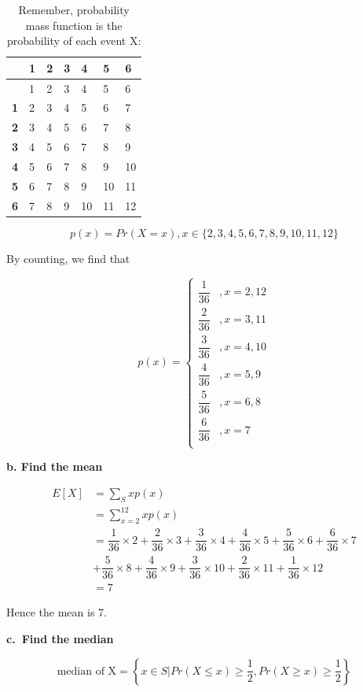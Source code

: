 \documentclass[
]{article}
\begin{document}
\begin{longtable}[]{@{}lllllll@{}}
\caption{Remember, probability mass function is the probability of each
event X:}\tabularnewline
\toprule
& 1 & 2 & 3 & 4 & 5 & 6 \\
\midrule
\endfirsthead
\toprule
& 1 & 2 & 3 & 4 & 5 & 6 \\
\midrule
\endhead
\textbf{1} & 2 & 3 & 4 & 5 & 6 & 7 \\
\textbf{2} & 3 & 4 & 5 & 6 & 7 & 8 \\
\textbf{3} & 4 & 5 & 6 & 7 & 8 & 9 \\
\textbf{4} & 5 & 6 & 7 & 8 & 9 & 10 \\
\textbf{5} & 6 & 7 & 8 & 9 & 10 & 11 \\
\textbf{6} & 7 & 8 & 9 & 10 & 11 & 12 \\
\bottomrule
\end{longtable}

\[
p(x)=Pr(X=x), x\in \{2,3,4,5,6,7,8,9,10,11,12\}
\]

By counting, we find that

\[
p(x)=\begin{cases}
\dfrac{1}{36} & ,x=2,12 \\
\dfrac{2}{36} & ,x=3,11 \\
\dfrac{3}{36} & ,x=4,10 \\
\dfrac{4}{36} & ,x=5,9 \\
\dfrac{5}{36} & ,x=6,8 \\
\dfrac{6}{36} & ,x=7 \\
\end{cases}
\]

\textbf{b. Find the mean}

\[
\begin{aligned}
E[X] &= \sum_{S}xp(x)\\
&= \sum_{x=2}^{12}xp(x)\\
&= \dfrac{1}{36} \times 2 + \dfrac{2}{36} \times 3 + \dfrac{3}{36} \times 4 + \dfrac{4}{36} \times 5 + \dfrac{5}{36} \times 6 + \dfrac{6}{36} \times 7 \\ &+ \dfrac{5}{36} \times 8 + \dfrac{4}{36} \times 9 + \dfrac{3}{36} \times 10 + \dfrac{2}{36} \times 11 + \dfrac{1}{36} \times 12\\
&= 7
\end{aligned}
\]

Hence the mean is 7.

\textbf{c.~Find the median}

\[
\text{median of X} = \left\{ x \in S | Pr(X\leq x) \geq \dfrac{1}{2}, Pr(X\geq x) \geq \dfrac{1}{2} \right\}
\]
\end{document}
